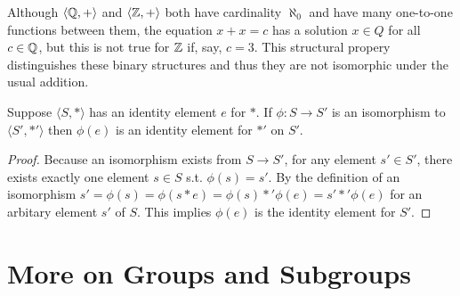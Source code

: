 \begin{example}
    Although $\langle \mathbb{Q}, + \rangle$ and $\langle \mathbb{Z}, + \rangle$ both have cardinality $\aleph_0$ and have many one-to-one functions between them, the equation $x+x = c$ has a solution $x \in Q$ for all $c \in \mathbb{Q}$, but this is not true for $\mathbb{Z}$ if, say, $c=3$. This structural propery distinguishes these binary structures and thus they are not isomorphic under the usual addition.
\end{example}
\begin{theorem}
    Suppose $\langle S, * \rangle$ has an identity element $e$ for $*$. If $\phi \colon S \to S'$ is an isomorphism to $\langle S', *' \rangle$ then $\phi(e)$ is an identity element for $*'$ on $S'$.
\end{theorem}
\begin{proof}
    Because an isomorphism exists from $S \to S'$, for any element $s' \in S'$, there exists exactly one element $s \in S$ s.t. $\phi(s) = s'$. By the definition of an isomorphism $s' = \phi(s) = \phi(s * e) = \phi(s) *' \phi(e) = s' *' \phi(e)$ for an arbitary element $s'$ of $S$. This implies $\phi(e)$ is the identity element for $S'$.
\end{proof}

\section{More on Groups and Subgroups}


